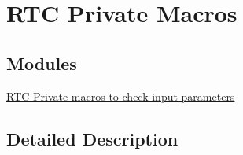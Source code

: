 \hypertarget{group___r_t_c___private___macros}{}\section{R\+TC Private Macros}
\label{group___r_t_c___private___macros}
\subsection*{Modules}
\begin{DoxyCompactItemize}
\item 
\hyperlink{group___r_t_c___i_s___r_t_c___definitions}{R\+T\+C Private macros to check input parameters}
\end{DoxyCompactItemize}


\subsection{Detailed Description}
